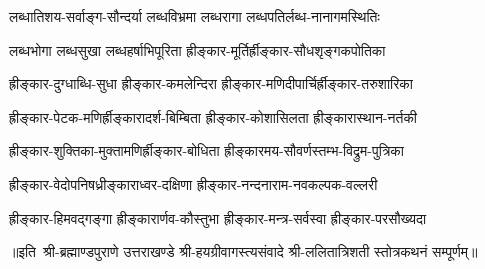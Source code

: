 \twolineshloka
{लब्धातिशय-सर्वाङ्ग-सौन्दर्या लब्धविभ्रमा}
{लब्धरागा लब्धपतिर्लब्ध-नानागमस्थितिः}

\twolineshloka
{लब्धभोगा लब्धसुखा लब्धहर्षाभिपूरिता}
{ह्रीङ्कार-मूर्तिर्ह्रीङ्कार-सौधशृङ्गकपोतिका}

\twolineshloka
{ह्रीङ्कार-दुग्धाब्धि-सुधा ह्रीङ्कार-कमलेन्दिरा}
{ह्रीङ्कार-मणिदीपार्चिर्ह्रीङ्कार-तरुशारिका}

\twolineshloka
{ह्रीङ्कार-पेटक-मणिर्ह्रीङ्कारादर्श-बिम्बिता}
{ह्रीङ्कार-कोशासिलता ह्रीङ्कारास्थान-नर्तकी}

\twolineshloka
{ह्रीङ्कार-शुक्तिका-मुक्तामणिर्ह्रीङ्कार-बोधिता}
{ह्रीङ्कारमय-सौवर्णस्तम्भ-विद्रुम-पुत्रिका}

\twolineshloka
{ह्रीङ्कार-वेदोपनिषध्रीङ्काराध्वर-दक्षिणा}
{ह्रीङ्कार-नन्दनाराम-नवकल्पक-वल्लरी}

\twolineshloka
{ह्रीङ्कार-हिमवद्गङ्गा ह्रीङ्कारार्णव-कौस्तुभा}
{ह्रीङ्कार-मन्त्र-सर्वस्वा ह्रीङ्कार-परसौख्यदा}

॥इति~श्री-ब्रह्माण्डपुराणे उत्तराखण्डे श्री-हयग्रीवागस्त्यसंवादे
श्री-ललितात्रिशती स्तोत्रकथनं सम्पूर्णम्॥
